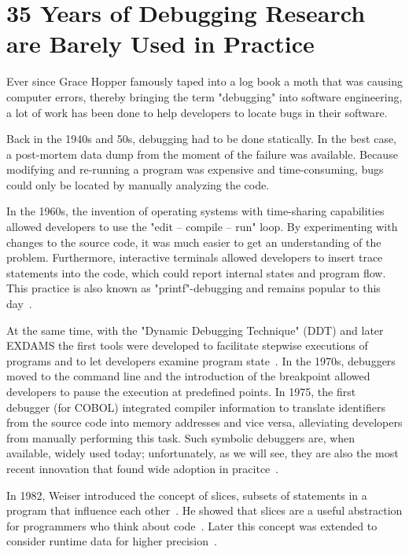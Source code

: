 
\section{35 Years of Debugging Research are Barely Used in Practice}

Ever since Grace Hopper famously taped into a log book a moth that was causing computer errors, thereby bringing the term "debugging" into software engineering, a lot of work has been done to help developers to locate bugs in their software.

Back in the 1940s and 50s, debugging had to be done statically.
In the best case, a post-mortem data dump from the moment of the failure was available.
Because modifying and re-running a program was expensive and time-consuming, bugs could only be located by manually analyzing the code.

In the 1960s, the invention of operating systems with time-sharing capabilities allowed developers to use the "edit -- compile -- run" loop.
By experimenting with changes to the source code, it was much easier to get an understanding of the problem.
Furthermore, interactive terminals allowed developers to insert trace statements into the code, which could report internal states and program flow.
This practice is also known as "printf"-debugging and remains popular to this day~\cite{perscheid_17_studying_the_advancement}.

At the same time, with the "Dynamic Debugging Technique" (DDT) and later EXDAMS the first tools were developed to facilitate stepwise executions of programs and to let developers examine program state~\cite{balzer_69_exdams_extendable_debugging}.
In the 1970s, debuggers moved to the command line and the introduction of the breakpoint allowed developers to pause the execution at predefined points.
In 1975, the first debugger (for COBOL) integrated compiler information to translate identifiers from the source code into memory addresses and vice versa, alleviating developers from manually performing this task.
Such symbolic debuggers are, when available, widely used today; unfortunately, as we will see, they are also the most recent innovation that found wide adoption in pracitce~\cite{perscheid_17_studying_the_advancement}.

In 1982, Weiser introduced the concept of slices, subsets of statements in a program that influence each other~\cite{weiser_81_program_slicing}. 
He showed that slices are a useful abstraction for programmers who think about code~\cite{weiser_82_programmers_use_slices_when}.
Later this concept was extended to consider runtime data for higher precision~\cite{agrawal_90_dynamic_program_slicing, korel_90_dynamic_slicing_of_computer}.

